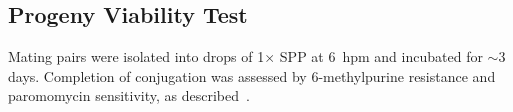 \documentclass[12pt]{article}
\begin{document}
\subsection{Progeny Viability Test}

Mating pairs were isolated into drops of 1$\times$ SPP at 6~hpm and incubated for ${\sim}3$ days.
Completion of conjugation was assessed by 6-methylpurine resistance and paromomycin sensitivity, as described~\citep{Mochizuki2002}.


\end{document}
